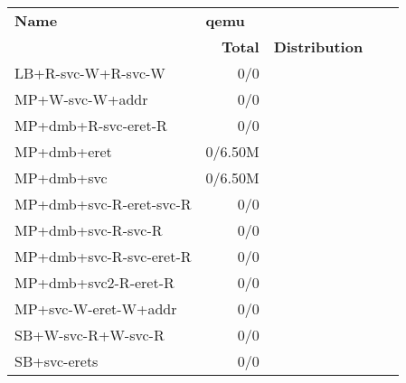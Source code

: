 \begin{tabular}{l  | r r l l}
   \textbf{Name}           & \multicolumn{3}{l}{\textbf{qemu}}        & \\
                           & \textbf{Total} & \textbf{Distribution} &  & \\
        LB+R-svc-W+R-svc-W &            0/0 &                       &  & \\ \hline 
           MP+W-svc-W+addr &            0/0 &                       &  & \\ \hline 
       MP+dmb+R-svc-eret-R &            0/0 &                       &  & \\ \hline 
               MP+dmb+eret &        0/6.50M &                       &  & \\ \hline 
                MP+dmb+svc &        0/6.50M &                       &  & \\ \hline 
   MP+dmb+svc-R-eret-svc-R &            0/0 &                       &  & \\ \hline 
        MP+dmb+svc-R-svc-R &            0/0 &                       &  & \\ \hline 
   MP+dmb+svc-R-svc-eret-R &            0/0 &                       &  & \\ \hline 
      MP+dmb+svc2-R-eret-R &            0/0 &                       &  & \\ \hline 
      MP+svc-W-eret-W+addr &            0/0 &                       &  & \\ \hline 
        SB+W-svc-R+W-svc-R &            0/0 &                       &  & \\ \hline 
              SB+svc-erets &            0/0 &                       &  & \\ \hline 
\end{tabular}
